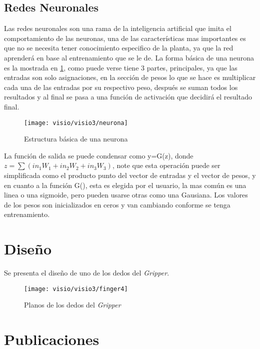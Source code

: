 \section{Redes Neuronales}
Las redes neuronales son una rama de la inteligencia artificial que imita el comportamiento de las neuronas, una de las características mas importantes es que no se necesita tener conocimiento especifico de la planta, ya que la red aprenderá en base al entrenamiento que se le de. La forma básica de una neurona es la mostrada en \cref{fig:neurona}, como puede verse tiene 3 partes, principales, ya que las entradas son solo asignaciones, en la sección de pesos lo que se hace es multiplicar cada una de las entradas por su respectivo peso, después se suman todos los resultados y al final se pasa a una función de activación que decidirá el resultado final. 
\begin{figure}[h]
	\centering
	\texttt{[image: visio/visio3/neurona]}
	\caption{Estructura básica de una neurona}
	\label{fig:neurona}
\end{figure}
La función de salida se puede condensar como y=G(z), donde $ z=\sum(in_1 W_1 + in_2 W_2 + in_3 W_3)$, note que esta operación puede ser simplificada como el producto punto del vector de entradas y el vector de pesos, y en cuanto a la función G(), esta es elegida por el usuario, la mas común es una linea o una sigmoide, pero pueden usarse otras como una Gausiana. Los valores de los pesos son inicializados en ceros y van cambiando conforme se tenga entrenamiento.



\chapter{Diseño}\label{diseno}
Se presenta el diseño de uno de los dedos del \textit{Gripper}.

\begin{figure}[h]
	\centering
	\texttt{[image: visio/visio3/finger4]}
	\caption{Planos de los dedos del \textit{Gripper}}
	\label{fig:finger4}
\end{figure}

\chapter{Publicaciones}\label{publicaciones}
\cite{tuyinincluded2017}
